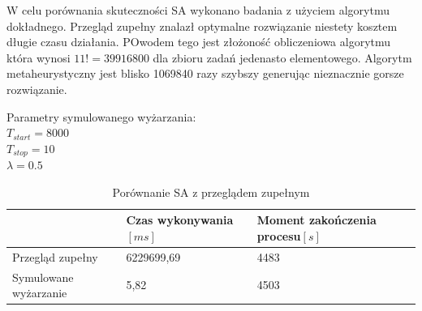 W celu porównania skuteczności SA wykonano badania z użyciem algorytmu dokładnego. Przegląd zupełny znalazł optymalne rozwiązanie niestety kosztem długie czasu działania. POwodem tego jest złożoność obliczeniowa algorytmu która wynosi $11! = 39916800$ dla zbioru zadań jedenasto elementowego. Algorytm metaheurystyczny jest blisko 1069840 razy szybszy generując nieznacznie gorsze rozwiązanie.

\breakparagraph{}
Parametry symulowanego wyżarzania:
\\$T_{start}=8000$\\$T_{stop}=10$\\$\lambda=0.5$

\begin{table}[H]
	\centering
	\caption{Porównanie SA z przeglądem zupełnym}
	\label{comapte_sa_bf}
	\begin{tabular}{lll}
		\toprule
		                       & Czas wykonywania$[ms]$ & Moment zakończenia procesu$[s]$ \\
		\midrule
		Przegląd zupełny     & 6229699,69             & 4483                             \\
		Symulowane wyżarzanie & 5,82                   & 4503                             \\
		\bottomrule
	\end{tabular}
\end{table}